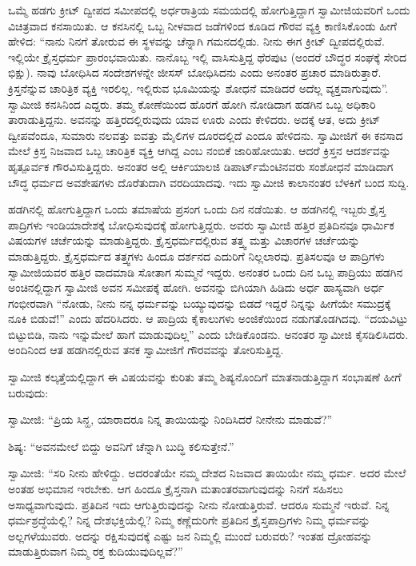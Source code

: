  ಒಮ್ಮೆ ಹಡಗು ಕ್ರೀಟ್ ದ್ವೀಪದ ಸಮೀಪದಲ್ಲಿ ಅರ್ಧರಾತ್ರಿಯ ಸಮಯದಲ್ಲಿ ಹೋಗುತ್ತಿದ್ದಾಗ ಸ್ವಾಮೀಜಿಯವರಿಗೆ ಒಂದು ವಿಚಿತ್ರವಾದ ಕನಸಾಯಿತು. ಆ ಕನಸಿನಲ್ಲಿ ಒಬ್ಬ ನೀಳವಾದ ಜಡೆಗಳಿಂದ ಕೂಡಿದ ಗೌರವ ವ್ಯಕ್ತಿ ಕಾಣಿಸಿಕೊಂಡು ಹೀಗೆ ಹೇಳಿದ: “ನಾನು ನಿನಗೆ ತೋರುವ ಈ ಸ್ಥಳವನ್ನು ಚೆನ್ನಾಗಿ ಗಮನದಲ್ಲಿಡು. ನೀನು ಈಗ ಕ್ರೀಟ್ ದ್ವೀಪದಲ್ಲಿರುವೆ. ಇಲ್ಲಿಯೇ ಕ್ರೈಸ್ತಧರ್ಮ ಪ್ರಾರಂಭವಾಯಿತು. ನಾನೊಬ್ಬ ಇಲ್ಲಿ ವಾಸಿಸುತ್ತಿದ್ದ ಥೆರಪುಟ (ಅಂದರೆ ಬೌದ್ಧರ ಸಂಘಕ್ಕೆ ಸೇರಿದ ಭಿಕ್ಷು). ನಾವು ಬೋಧಿಸಿದ ಸಂದೇಶಗಳನ್ನೇ ಜೀಸಸ್ ಬೋಧಿಸಿದನು ಎಂದು ಅನಂತರ ಪ್ರಚಾರ ಮಾಡಿರುತ್ತಾರೆ. ಕ್ರಿಸ್ತನೆನ್ನುವ ಚಾರಿತ್ರಿಕ ವ್ಯಕ್ತಿ ಇರಲಿಲ್ಲ. ಇಲ್ಲಿರುವ ಭೂಮಿಯನ್ನು ಶೋಧನೆ ಮಾಡಿದರೆ ಅದೆಲ್ಲ ವ್ಯಕ್ತವಾಗುವುದು”. ಸ್ವಾಮೀಜಿ ಕನಸಿನಿಂದ ಎದ್ದರು. ತಮ್ಮ ಕೋಣೆಯಿಂದ ಹೊರಗೆ ಹೋಗಿ ನೋಡಿದಾಗ ಹಡಗಿನ ಒಬ್ಬ ಅಧಿಕಾರಿ ತಾರಾಡುತ್ತಿದ್ದನು. ಅವನನ್ನು ಹತ್ತಿರದಲ್ಲಿರುವುದು ಯಾವ ಊರು ಎಂದು ಕೇಳಿದರು. ಅದಕ್ಕೆ ಆತ, ಅದು ಕ್ರೀಟ್ ದ್ವೀಪವೆಂದೂ, ಸುಮಾರು ನಲವತ್ತು ಐವತ್ತು ಮೈಲಿಗಳ ದೂರದಲ್ಲಿದೆ ಎಂದೂ ಹೇಳಿದನು. ಸ್ವಾಮೀಜಿಗೆ ಈ ಕನಸಾದ ಮೇಲೆ ಕ್ರಿಸ್ತ ನಿಜವಾದ ಒಬ್ಬ ಚಾರಿತ್ರಿಕ ವ್ಯಕ್ತಿ ಆಗಿದ್ದ ಎಂಬ ನಂಬಿಕೆ ಜಾರಿಹೋಯಿತು. ಆದರೆ ಕ್ರಿಸ್ತನ ಆದರ್ಶವನ್ನು ಹೃತ್ಪೂರ್ವಕ ಗೌರವಿಸುತ್ತಿದ್ದರು. ಅನಂತರ ಅಲ್ಲಿ ಆರ್ಕಿಯಾಲಜಿ ಡಿಪಾರ್ಟ್‍ಮೆಂಟಿನವರು ಸಂಶೋಧನೆ ಮಾಡಿದಾಗ ಬೌದ್ಧ ಧರ್ಮದ ಅವಶೇಷಗಳು ದೊರೆತುದಾಗಿ ವರದಿಯಾದವು. ಇದು ಸ್ವಾಮೀಜಿ ಕಾಲಾನಂತರ ಬೆಳಕಿಗೆ ಬಂದ ಸುದ್ದಿ. 

 ಹಡಗಿನಲ್ಲಿ ಹೋಗುತ್ತಿದ್ದಾಗ ಒಂದು ತಮಾಷೆಯ ಪ್ರಸಂಗ ಒಂದು ದಿನ ನಡೆಯಿತು. ಆ ಹಡಗಿನಲ್ಲಿ ಇಬ್ಬರು ಕ್ರೈಸ್ತ ಪಾದ್ರಿಗಳು ಇಂಡಿಯಾದೇಶಕ್ಕೆ ಬೋಧಿಸುವುದಕ್ಕೆ ಹೋಗುತ್ತಿದ್ದರು. ಅವರು ಸ್ವಾಮೀಜಿ ಹತ್ತಿರ ಪ್ರತಿದಿನವೂ ಧಾರ್ಮಿಕ ವಿಷಯಗಳ ಚರ್ಚೆಯನ್ನು ಮಾಡುತ್ತಿದ್ದರು. ಕ್ರೈಸ್ತಧರ್ಮದಲ್ಲಿರುವ ತತ್ತ್ವ ಮತ್ತು ವಿಚಾರಗಳ ಚರ್ಚೆಯನ್ನು ಮಾಡುತ್ತಿದ್ದರು. ಕ್ರೈಸ್ತಧರ್ಮದ ತತ್ತ್ವಗಳು ಹಿಂದೂ ದರ್ಶನದ ಎದುರಿಗೆ ನಿಲ್ಲಲಾರವು. ಪ್ರತಿಸಲವೂ ಆ ಪಾದ್ರಿಗಳು ಸ್ವಾಮೀಜಿಯವರ ಹತ್ತಿರ ವಾದಮಾಡಿ ಸೋತಾಗ ಸುಮ್ಮನೆ ಇದ್ದರು. ಅನಂತರ ಒಂದು ದಿನ ಒಬ್ಬ ಪಾದ್ರಿಯು ಹಡಗಿನ ಅಂಚಿನಲ್ಲಿದ್ದಾಗ ಸ್ವಾಮೀಜಿ ಅವನ ಸಮೀಪಕ್ಕೆ ಹೋಗಿ. ಅವನನ್ನು ಬಿಗಿಯಾಗಿ ಹಿಡಿದು ಅರ್ಧ ಹಾಸ್ಯವಾಗಿ ಅರ್ಧ ಗಂಭೀರವಾಗಿ “ನೋಡು, ನೀನು ನನ್ನ ಧರ್ಮವನ್ನು ಬಯ್ಯುವುದನ್ನು ಬಿಡದೆ ಇದ್ದರೆ ನಿನ್ನನ್ನು ಹೀಗೆಯೇ ಸಮುದ್ರಕ್ಕೆ ನೂಕಿ ಬಿಡುವೆ!” ಎಂದು ಹೆದರಿಸಿದರು. ಆ ಪಾದ್ರಿಯ ಕೈಕಾಲುಗಳು ಅಂಜಿಕೆಯಿಂದ ನಡುಗತೊಡಗಿದವು. “ದಯವಿಟ್ಟು ಬಿಟ್ಟುಬಿಡಿ, ನಾನು ಇನ್ನುಮೇಲೆ ಹಾಗೆ ಮಾಡುವುದಿಲ್ಲ” ಎಂದು ಬೇಡಿಕೊಂಡನು. ಅನಂತರ ಸ್ವಾಮೀಜಿ ಕೈಸಡಿಲಿಸಿದರು. ಅಂದಿನಿಂದ ಆತ ಹಡಗಿನಲ್ಲಿರುವ ತನಕ ಸ್ವಾಮೀಜಿಗೆ ಗೌರವವನ್ನು ತೋರಿಸುತ್ತಿದ್ದ. 

 ಸ್ವಾಮೀಜಿ ಕಲ್ಕತ್ತೆಯಲ್ಲಿದ್ದಾಗ ಈ ವಿಷಯವನ್ನು ಕುರಿತು ತಮ್ಮ ಶಿಷ್ಯನೊಂದಿಗೆ ಮಾತನಾಡುತ್ತಿದ್ದಾಗ ಸಂಭಾಷಣೆ ಹೀಗೆ ಬರುವುದು: 

 ಸ್ವಾಮೀಜಿ: “ಪ್ರಿಯ ಸಿನ್ಹ, ಯಾರಾದರೂ ನಿನ್ನ ತಾಯಿಯನ್ನು ನಿಂದಿಸಿದರೆ ನೀನೇನು ಮಾಡುವೆ?” 

 ಶಿಷ್ಯ: “ಅವನಮೇಲೆ ಬಿದ್ದು ಅವನಿಗೆ ಚೆನ್ನಾಗಿ ಬುದ್ಧಿ ಕಲಿಸುತ್ತೇನೆ.” 

 ಸ್ವಾಮೀಜಿ: “ಸರಿ ನೀನು ಹೇಳಿದ್ದು. ಅದರಂತೆಯೇ ನಮ್ಮ ದೇಶದ ನಿಜವಾದ ತಾಯಿಯೇ ನಮ್ಮ ಧರ್ಮ. ಅದರ ಮೇಲೆ ಅಂತಹ ಅಭಿಮಾನ ಇರಬೇಕು. ಆಗ ಹಿಂದೂ ಕ್ರೈಸ್ತನಾಗಿ ಮತಾಂತರವಾಗುವುದನ್ನು ನಿನಗೆ ಸಹಿಸಲು ಅಸಾಧ್ಯವಾಗುವುದು. ಪ್ರತಿದಿನ ಇದು ಆಗುತ್ತಿರುವುದನ್ನು ನೀನು ನೋಡುತ್ತಿರುವೆ. ಆದರೂ ಸುಮ್ಮನೆ ಇರುವೆ. ನಿನ್ನ ಧರ್ಮಶ್ರದ್ಧೆಯೆಲ್ಲಿ? ನಿನ್ನ ದೇಶಭಕ್ತಿಯೆಲ್ಲಿ? ನಿಮ್ಮ ಕಣ್ಣೆದುರಿಗೇ ಪ್ರತಿದಿನ ಕ್ರೈಸ್ತಪಾದ್ರಿಗಳು ನಿಮ್ಮ ಧರ್ಮವನ್ನು ಅಲ್ಲಗಳೆಯುವರು. ಅದನ್ನು ರಕ್ಷಿಸುವುದಕ್ಕೆ ಎಷ್ಟು ಜನ ನಿಮ್ಮಲ್ಲಿ ಮುಂದೆ ಬರುವರು? ಇಂತಹ ದ್ರೋಹವನ್ನು ಮಾಡುತ್ತಿರುವಾಗ ನಿಮ್ಮ ರಕ್ತ ಕುದಿಯುವುದಿಲ್ಲವೆ?” 

